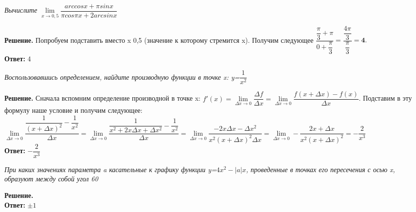 \documentclass[a4paper, 10pt]{article}
\begin{document}
\begin{spacing}{1}
\begin{center}
\end{center}

\noindent \textit{ Вычислите $\lim\limits_{x \to 0,5}\dfrac{arccosx+\pi sinx}{\pi cos\pi x+2arcsinx}$
}

\noindent \textbf{Решение.} Попробуем подставить вместо x 0,5 (значение к которому стремится x). Получим следующее $\dfrac{\dfrac{\pi}{3}+\pi}{0+\dfrac{\pi}{3}} = \dfrac{\dfrac{4\pi}{3}}{\dfrac{\pi}{3}}=\textbf{4}.$\\
\textbf{Ответ:} 4

\begin{center}
\end{center}

\noindent \textit{Воспользовавшись определением, найдите производную функции в точке x: y=$\dfrac{1}{x^2}$
}

\noindent \textbf{Решение.} Сначала вспомним определение производной в точке x: $f'(x)=\lim\limits_{\Delta x \to 0}\dfrac{\Delta f}{\Delta x}=\lim\limits_{\Delta x \to 0}\dfrac{f(x+\Delta x)-f(x)}{\Delta x}$. Подставим в эту формулу наше условие и получим следующее: $\lim\limits_{\Delta x \to 0} \dfrac{\dfrac{1}{(x+\Delta x)^2}-\dfrac{1}{x^2}}{\Delta x}=\lim\limits_{\Delta x\to 0}\dfrac{\dfrac{1}{x^2+2x\Delta x+\Delta x^2}-\dfrac{1}{x^2}}{\Delta x}=\lim\limits_{\Delta x\to 0}\dfrac{-2x\Delta x-\Delta x^2}{x^2(x+\Delta x)^2\Delta x}=\lim\limits_{\Delta x\to 0}-\dfrac{2x+\Delta x}{x^2(x+\Delta x)^2}=-\dfrac{2}{x^3}$\\
\textbf{Ответ:} $-\dfrac{2}{x^3}$

\begin{center}
\end{center}

\noindent \textit{При каких значениях параметра a касательные к графику функции y=$4x^2-|a|x$, проведенные в точках его пересечения с осью x, образуют между собой угол 60\textdegree
}

\noindent \textbf{Решение.} \\
\textbf{Ответ:} $\pm 1$
		
\end{spacing}
\end{document}
